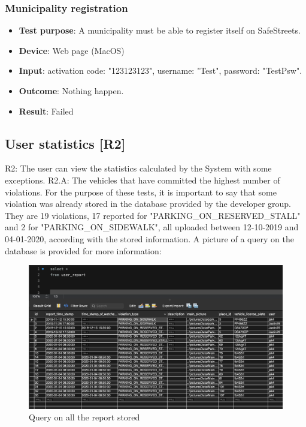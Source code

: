 \documentclass[../ATD.tex]{subfiles}
\begin{document}
    \subsubsection{Municipality registration}\label{subsubsec:municipality-registration}
    \begin{itemize}
        \item \textbf{Test purpose}: A municipality must be able to register itself on SafeStreets.
        \item \textbf{Device}: Web page (MacOS)
        \item \textbf{Input}: activation code: "123123123", username: "Test", password: "TestPsw".
        \item \textbf{Outcome}: Nothing happen.
        \item \textbf{Result}: Failed
    \end{itemize}

    \subsection{User statistics [R2]}\label{subsec:user-statistics}
    R2: The user can view the statistics calculated by the System with some exceptions.
    \newline
    R2.A: The vehicles that have committed the highest number of violations.
    \newline
    For the purpose of these tests, it is important to say that some violation was already stored in the database provided by the developer group.
    They are 19 violations, 17 reported for "PARKING_ON_RESERVED_STALL" and 2 for "PARKING_ON_SIDEWALK", all uploaded between 12-10-2019 and 04-01-2020, according with the stored information.
    A picture of a query on the database is provided for more information:
    \begin{figure}[H]
        \centering
        \includegraphics{../assets/database_user_report.png}
        \caption{Query on all the report stored}
    \end{figure}
\end{document}
